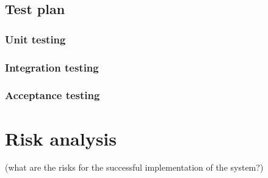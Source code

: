 \documentclass[a4paper]{article}
\begin{document}
\subsection{Test plan}

\subsubsection{Unit testing}

\subsubsection{Integration testing}

\subsubsection{Acceptance testing}

\section{Risk analysis}
(what are the risks for the successful implementation of the system?)
\end{document}
